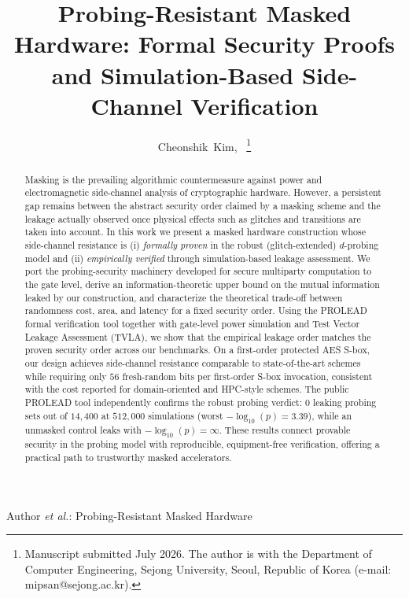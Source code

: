 \documentclass[lettersize,journal]{IEEEtran}
\begin{document}
\title{Probing-Resistant Masked Hardware: Formal Security Proofs and Simulation-Based Side-Channel Verification}

\author{Cheonshik~Kim,~
\thanks{Manuscript submitted July 2026. The author is with the Department of
Computer Engineering, Sejong University, Seoul, Republic of Korea
(e-mail: mipsan@sejong.ac.kr).}
}

%
{Author \MakeLowercase{\textit{et al.}}: Probing-Resistant Masked Hardware}

\maketitle

\begin{abstract}
Masking is the prevailing algorithmic countermeasure against power and
electromagnetic side-channel analysis of cryptographic hardware. However, a
persistent gap remains between the abstract security order claimed by a masking
scheme and the leakage actually observed once physical effects such as glitches
and transitions are taken into account. In this work we present a masked
hardware construction whose side-channel resistance is (i) \emph{formally
proven} in the robust (glitch-extended) $d$-probing model and (ii)
\emph{empirically verified} through simulation-based leakage assessment. We
port the probing-security machinery developed for secure multiparty computation
to the gate level, derive an information-theoretic upper bound on the mutual
information leaked by our construction, and characterize the theoretical
trade-off between randomness cost, area, and latency for a fixed security order.
Using the PROLEAD formal verification tool together with
gate-level power simulation and Test Vector Leakage Assessment (TVLA), we show
that the empirical leakage order matches the proven security order across our
benchmarks. On a first-order protected AES S-box, our design
achieves side-channel resistance comparable to state-of-the-art schemes
while requiring only $56$ fresh-random bits per first-order S-box
invocation, consistent with
the cost reported for domain-oriented and HPC-style schemes.  The public PROLEAD tool independently confirms the
robust probing verdict: $0$ leaking probing sets out of $14{,}400$ at
$512{,}000$ simulations (worst $-\log_{10}(p)=3.39$), while an unmasked
control leaks with $-\log_{10}(p)=\infty$. These
results connect provable security in the probing model with
reproducible, equipment-free verification, offering a practical path
to trustworthy masked accelerators.
\end{abstract}
\end{document}
